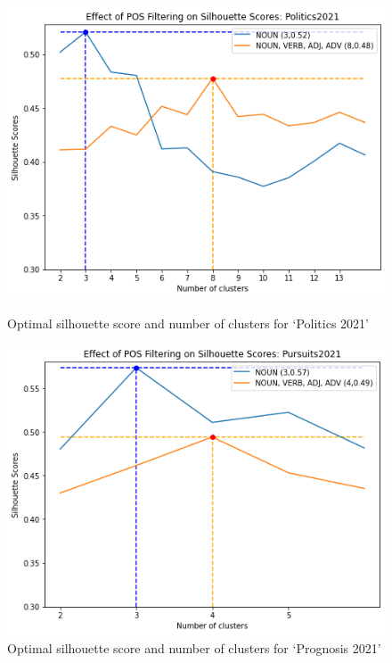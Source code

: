 \begin{figure}[H]
  \begin{minipage}[t]{.49\textwidth}
    \centering
    \includegraphics[width=\linewidth]{images/eval/politics2021_sil.png}
    \caption{Optimal silhouette score and number of clusters for `Politics 2021'}
    \label{fig:pos_politics2021}
  \end{minipage}
  \begin{minipage}[t]{.49\textwidth}
    \centering
    \includegraphics[width=\linewidth]{images/eval/pursuits2021_sil.png}
    \caption{Optimal silhouette score and number of clusters for `Prognosis 2021'}
    \label{fig:pos_pursuit2021}
  \end{minipage}
\end{figure}

